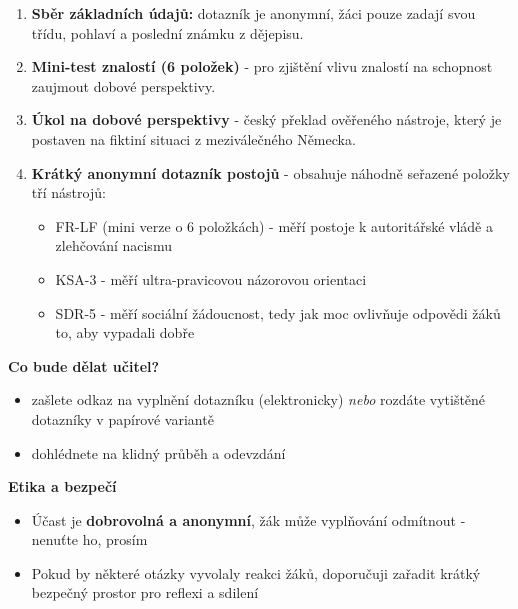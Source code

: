 \documentclass[
  12pt,
  english,
  a4paper,
  extrafontsizes,onecolumn,openright
  ]{memoir}
\providecommand{\tightlist}{%
  \setlength{\itemsep}{0pt}\setlength{\parskip}{0pt}}
\begin{document}
\begin{enumerate}
\def\labelenumi{\arabic{enumi}.}
\tightlist
\item
  \textbf{Sběr základních údajů:} dotazník je anonymní, žáci pouze zadají svou třídu, pohlaví a poslední známku z dějepisu.
\item
  \textbf{Mini-test znalostí (6 položek)} - pro zjištění vlivu znalostí na schopnost zaujmout dobové perspektivy. \autocite{Huijgen_et_al2017Toward}
\item
  \textbf{Úkol na dobové perspektivy} - český překlad ověřeného nástroje, který je postaven na fiktiní situaci z meziválečného Německa. \autocite{Hartmann_Hasselhorn2008Historical}
\item
  \textbf{Krátký anonymní dotazník postojů} - obsahuje náhodně seřazené položky tří nástrojů:

  \begin{itemize}
  \tightlist
  \item
    FR-LF (mini verze o 6 položkách) - měří postoje k autoritářské vládě a zlehčování nacismu \autocite{Decker_et_al2013Rechtsextremismus}
  \item
    KSA-3 - měří ultra-pravicovou názorovou orientaci \autocite{Beierlein_et_al2014Die_Kurzskala,Nießen_et_al2019An_English}
  \item
    SDR-5 - měří sociální žádoucnost, tedy jak moc ovlivňuje odpovědi žáků to, aby vypadali dobře \autocite{Hays_et_al1989A_Five}
  \end{itemize}
\end{enumerate}

\textbf{Co bude dělat učitel?}

\begin{itemize}
\tightlist
\item
  zašlete odkaz na vyplnění dotazníku (elektronicky) \emph{nebo} rozdáte vytištěné dotazníky v papírové variantě
\item
  dohlédnete na klidný průběh a odevzdání
\end{itemize}

\textbf{Etika a bezpečí}

\begin{itemize}
\tightlist
\item
  Účast je \textbf{dobrovolná a anonymní}, žák může vyplňování odmítnout - nenuťte ho, prosím
\item
  Pokud by některé otázky vyvolaly reakci žáků, doporučuji zařadit krátký bezpečný prostor pro reflexi a sdilení
\end{itemize}
\end{document}
